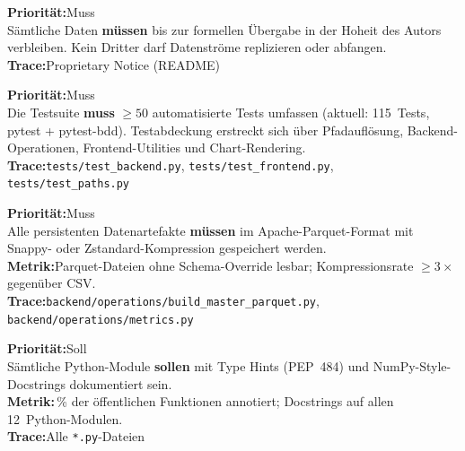 \documentclass[11pt, a4paper, oneside, openany]{report}
\newcommand{\code}[1]{\texttt{\small\textcolor{DeepNavy}{#1}}}
\begin{document}
\vspace{6pt}

\begin{reqbox}
\textbf{Priorität:}\;Muss \\[4pt]
Sämtliche Daten \textbf{müssen} bis zur formellen Übergabe in der Hoheit des Autors verbleiben. Kein Dritter darf Datenströme replizieren oder abfangen. \\[4pt]
\textbf{Trace:}\;Proprietary Notice (README)
\end{reqbox}

\vspace{6pt}

\begin{reqbox}
\textbf{Priorität:}\;Muss \\[4pt]
Die Testsuite \textbf{muss} $\geq 50$ automatisierte Tests umfassen (aktuell: 115~Tests, pytest + pytest-bdd). Testabdeckung erstreckt sich über Pfadauflösung, Backend-Operationen, Frontend-Utilities und Chart-Rendering. \\[4pt]
\textbf{Trace:}\;\code{tests/test\_backend.py}, \code{tests/test\_frontend.py}, \code{tests/test\_paths.py}
\end{reqbox}

\vspace{6pt}

\begin{reqbox}
\textbf{Priorität:}\;Muss \\[4pt]
Alle persistenten Datenartefakte \textbf{müssen} im Apache-Parquet-Format mit Snappy- oder Zstandard-Kompression gespeichert werden. \\[4pt]
\textbf{Metrik:}\;Parquet-Dateien ohne Schema-Override lesbar; Kompressionsrate $\geq 3\times$ gegenüber CSV. \\[4pt]
\textbf{Trace:}\;\code{backend/operations/build\_master\_parquet.py}, \code{backend/operations/metrics.py}
\end{reqbox}

\vspace{6pt}

\begin{reqbox}
\textbf{Priorität:}\;Soll \\[4pt]
Sämtliche Python-Module \textbf{sollen} mit Type Hints (PEP~484) und NumPy-Style-Docstrings dokumentiert sein. \\[4pt]
\textbf{Metrik:}\,\% der öffentlichen Funktionen annotiert; Docstrings auf allen 12~Python-Modulen. \\[4pt]
\textbf{Trace:}\;Alle \code{*.py}-Dateien
\end{reqbox}
\end{document}
